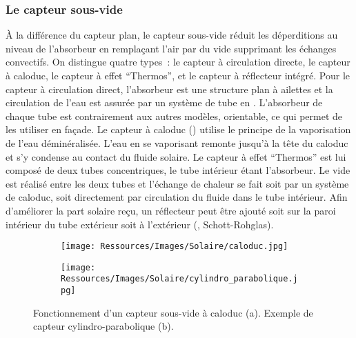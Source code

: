 \subsubsection{Le capteur sous-vide} %
\label{ssub:le_capteur_sous_vide}
À la différence du capteur plan, le capteur sous-vide réduit les déperditions au niveau de
l’absorbeur en remplaçant l’air par du vide supprimant les échanges convectifs. On
distingue quatre types~: le capteur à circulation directe, le capteur à caloduc, le
capteur à effet \enquote{Thermos}, et le capteur à réflecteur intégré. Pour le capteur à
circulation direct, l’absorbeur est une structure plan à ailettes et la circulation de
l’eau est assurée par un système de tube en . L’absorbeur de chaque tube est
contrairement aux autres modèles, orientable, ce qui permet de les utiliser en façade. Le
capteur à caloduc () utilise le principe de la vaporisation
de l’eau déminéralisée. L’eau en se
vaporisant remonte jusqu’à la tête du caloduc et s’y condense au contact du fluide
solaire. Le capteur à effet \enquote{Thermos} est lui composé de deux tubes concentriques,
le tube intérieur étant l’absorbeur. Le vide est réalisé entre les deux tubes et l’échange
de chaleur se fait soit par un système de caloduc, soit directement par circulation du
fluide dans le tube intérieur. Afin d’améliorer la part solaire reçu, un réflecteur peut
être ajouté soit sur la paroi intérieur du tube extérieur soit à l’extérieur
(, Schott-Rohglas).

\begin{figure}
    \centering
    \begin{subfigure}[b]{0.35\textwidth}
        \centering
        \texttt{[image: Ressources/Images/Solaire/caloduc.jpg]}
        \caption{}
        \label{fig:capteur_sous_vide}
    \end{subfigure}
    \quad
    \begin{subfigure}[b]{0.55\textwidth}
        \centering
        \texttt{[image: Ressources/Images/Solaire/cylindro\_parabolique.jpg]}
        \caption{}
        \label{fig:capteur_cylindro_parabolique}
    \end{subfigure}
    \caption[Description des capteurs plans]
             {Fonctionnement d’un capteur sous-vide à caloduc (a). Exemple de
              capteur cylindro-parabolique (b).}
    \label{fig:capteur_vide_parabolique}
\end{figure}


